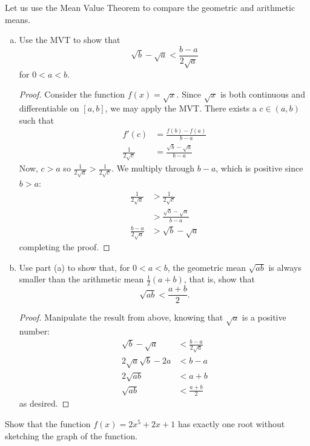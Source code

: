 \question Let us use the Mean Value Theorem to compare the geometric and arithmetic means.
\begin{enumerate}[(a)]
  \item Use the MVT to show that \[ \sqrt{b} - \sqrt{a} < \frac{b-a}{2\sqrt{a}} \] for $0 < a < b$.
        \begin{proof}
          Consider the function $f(x) = \sqrt{x}$.
          Since $\sqrt{x}$ is both continuous and differentiable on $[a,b]$, we may apply the MVT\@.
          There exists a $c\in(a,b)$ such that \begin{align*}
            f'(c)               & = \frac{f(b)-f(a)}{b-a}         \\
            \frac{1}{2\sqrt{c}} & = \frac{\sqrt{b}-\sqrt{a}}{b-a}
          \end{align*}
          Now, $c > a$ so $\frac{1}{2\sqrt{a}} > \frac{1}{2\sqrt{c}}$.
          We multiply through $b-a$, which is positive since $b > a$:
          \begin{align*}
            \frac{1}{2\sqrt{a}}   & > \frac{1}{2\sqrt{c}}           \\
                                  & > \frac{\sqrt{b}-\sqrt{a}}{b-a} \\
            \frac{b-a}{2\sqrt{a}} & > \sqrt{b}-\sqrt{a}
          \end{align*}
          completing the proof.
        \end{proof}
  \item Use part (a) to show that, for $0 < a < b$,
        the geometric mean $\sqrt{ab}$ is always smaller than the arithmetic mean $\frac12(a+b)$,
        that is, show that \[ \sqrt{ab} < \frac{a+b}{2}. \]
        \begin{proof}
          Manipulate the result from above, knowing that $\sqrt{a}$ is a positive number:
          \begin{align*}
            \sqrt{b} - \sqrt{a}    & < \frac{b-a}{2\sqrt{a}} \\
            2\sqrt{a}\sqrt{b} - 2a & < b-a                   \\
            2\sqrt{ab}             & < a + b                 \\
            \sqrt{ab}              & < \frac{a+b}{2}
          \end{align*}
          as desired.
        \end{proof}
\end{enumerate}


\question Show that the function $f(x)=2x^5+2x+1$ has exactly one root without sketching the graph of the function.

